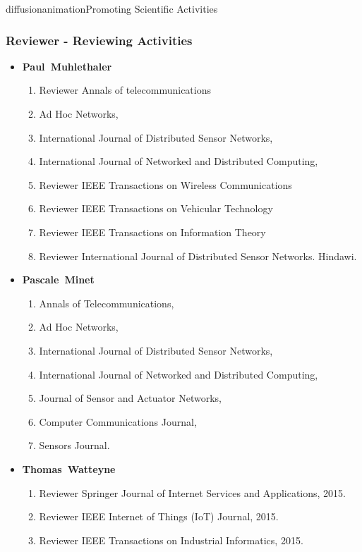 \documentclass{ra2016}
\newcommand{\paul}             {\textbf{Paul~Muhlethaler}}
\newcommand{\pascale}          {\textbf{Pascale~Minet}}
\newcommand{\thomas}           {\textbf{Thomas~Watteyne}}
\begin{document}
\begin{module}{diffusion}{animation}{Promoting Scientific Activities}
    
    \subsubsection{Reviewer - Reviewing Activities}
 
       \begin{itemize}
    \item \paul
        \begin{enumerate}
            \item Reviewer Annals of telecommunications
            \item Ad Hoc Networks,
            \item International Journal of Distributed Sensor Networks,
            \item International Journal of Networked and Distributed Computing,
            \item Reviewer IEEE Transactions on Wireless Communications
            \item Reviewer IEEE Transactions on Vehicular Technology
            \item Reviewer IEEE Transactions on Information Theory
            \item Reviewer International Journal of Distributed Sensor Networks. Hindawi. 
        \end{enumerate}
    \item \pascale
        \begin{enumerate}
           \item Annals of Telecommunications,
		\item Ad Hoc Networks,
		\item International Journal of Distributed Sensor Networks,
		\item International Journal of Networked and Distributed Computing,
		\item Journal of Sensor and Actuator Networks,
		\item Computer Communications Journal,
		\item Sensors Journal.
        \end{enumerate}
    \item \thomas
        \begin{enumerate}
            \item Reviewer Springer Journal of Internet Services and Applications, 2015.
            \item Reviewer IEEE Internet of Things (IoT) Journal, 2015.
            \item Reviewer IEEE Transactions on Industrial Informatics, 2015.

\end{enumerate}
\end{itemize}
\end{module}
\end{document}

